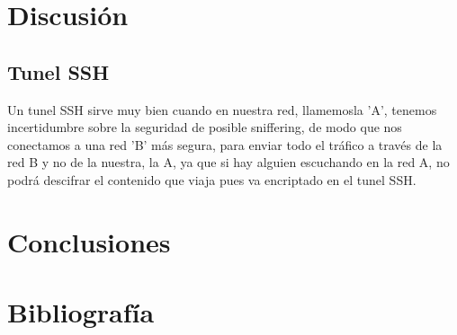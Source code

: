 \documentclass{article}
\begin{document}
\section{Discusi\'on}

\subsection{Tunel SSH}

Un tunel SSH sirve muy bien cuando en nuestra red, llamemosla 'A', tenemos incertidumbre sobre la seguridad de posible sniffering, de modo que nos conectamos a una red 'B' m\'as segura, para enviar todo el tr\'afico a trav\'es de la red B y no de la nuestra, la A, ya que si hay alguien escuchando en la red A, no podr\'a descifrar el contenido que viaja pues va encriptado en el tunel SSH.

\section{Conclusiones}

\section{Bibliograf\'ia}
\end{document}
